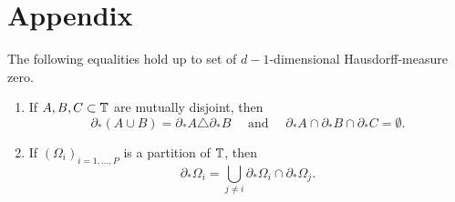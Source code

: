 \chapter{Appendix}

\begin{lemma}
	\label{identities_for_measure_theoretic_boundaries}
	The following equalities hold up to set of $d-1$-dimensional Hausdorff-measure zero.
	\begin{enumerate}
		\item 
		\label{item_disjoint_sets}
		If $ A, B, C \subset \operatorname{\mathbb{T}} $ are mutually disjoint, then
		\begin{equation*}	
			\partial_{ \ast } ( A \cup B ) = \partial_{ \ast } A \triangle \partial_{ \ast } B
			\quad 
			\text{ and }
			\quad
			\partial_{ \ast } A
			\cap
			\partial_{ \ast } B
			\cap
			\partial_{ \ast } C
			=
			\emptyset.
		\end{equation*}
		
		\item 
		\label{rewriting_boundary_via_interfaces}
		If $ ( \Omega_{ i } )_{ i = 1 , \dotsc , P } $ is a partition of $ \operatorname{\mathbb{T}} $, then
		\begin{equation*}
			\partial_{ \ast } \Omega_{ i }
			=
			\bigcup_{ j \neq i }
			\partial_{ \ast } \Omega_{ i }
			\cap
			\partial_{ \ast } \Omega_{ j }.
		\end{equation*}
	\end{enumerate}
\end{lemma}

